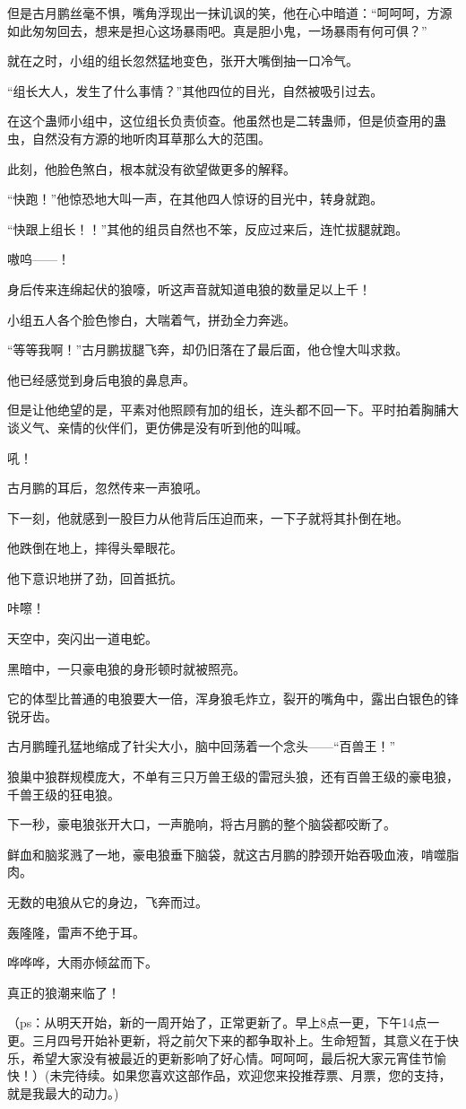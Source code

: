 \begin{this_body}
但是古月鹏丝毫不惧，嘴角浮现出一抹讥讽的笑，他在心中暗道：“呵呵呵，方源如此匆匆回去，想来是担心这场暴雨吧。真是胆小鬼，一场暴雨有何可俱？”

就在之时，小组的组长忽然猛地变色，张开大嘴倒抽一口冷气。

“组长大人，发生了什么事情？”其他四位的目光，自然被吸引过去。

在这个蛊师小组中，这位组长负责侦查。他虽然也是二转蛊师，但是侦查用的蛊虫，自然没有方源的地听肉耳草那么大的范围。

此刻，他脸色煞白，根本就没有欲望做更多的解释。

“快跑！”他惊恐地大叫一声，在其他四人惊讶的目光中，转身就跑。

“快跟上组长！！”其他的组员自然也不笨，反应过来后，连忙拔腿就跑。

嗷呜——！

身后传来连绵起伏的狼嚎，听这声音就知道电狼的数量足以上千！

小组五人各个脸色惨白，大喘着气，拼劲全力奔逃。

“等等我啊！”古月鹏拔腿飞奔，却仍旧落在了最后面，他仓惶大叫求救。

他已经感觉到身后电狼的鼻息声。

但是让他绝望的是，平素对他照顾有加的组长，连头都不回一下。平时拍着胸脯大谈义气、亲情的伙伴们，更仿佛是没有听到他的叫喊。

吼！

古月鹏的耳后，忽然传来一声狼吼。

下一刻，他就感到一股巨力从他背后压迫而来，一下子就将其扑倒在地。

他跌倒在地上，摔得头晕眼花。

他下意识地拼了劲，回首抵抗。

咔嚓！

天空中，突闪出一道电蛇。

黑暗中，一只豪电狼的身形顿时就被照亮。

它的体型比普通的电狼要大一倍，浑身狼毛炸立，裂开的嘴角中，露出白银色的锋锐牙齿。

古月鹏瞳孔猛地缩成了针尖大小，脑中回荡着一个念头——“百兽王！”

狼巢中狼群规模庞大，不单有三只万兽王级的雷冠头狼，还有百兽王级的豪电狼，千兽王级的狂电狼。

下一秒，豪电狼张开大口，一声脆响，将古月鹏的整个脑袋都咬断了。

鲜血和脑浆溅了一地，豪电狼垂下脑袋，就这古月鹏的脖颈开始吞吸血液，啃噬脂肉。

无数的电狼从它的身边，飞奔而过。

轰隆隆，雷声不绝于耳。

哗哗哗，大雨亦倾盆而下。

真正的狼潮来临了！

（ps：从明天开始，新的一周开始了，正常更新了。早上8点一更，下午14点一更。三月四号开始补更新，将之前欠下来的都争取补上。生命短暂，其意义在于快乐，希望大家没有被最近的更新影响了好心情。呵呵呵，最后祝大家元宵佳节愉快！）(未完待续。如果您喜欢这部作品，欢迎您来投推荐票、月票，您的支持，就是我最大的动力。)

\end{this_body}

